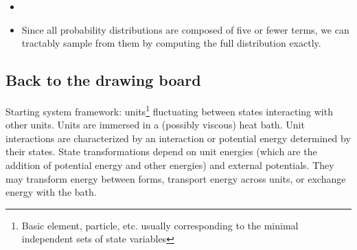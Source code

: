 \documentclass[12pt,letterpaper]{article}
\newcommand{\mb}{\mathbf}
\begin{document}
\begin{itemize}
\begin{align*}
\end{align*}
For $j \in  S$, write
\begin{align*}
w'_{j} = \left|q_{i}q_{j}(\mb{e}_{ij} \cdot \mb{n})\right| \quad \textrm{and} \quad w_{j} = {w'_{j} \over \sum_{j}w'_{j}},
\end{align*}
where $\mb{e}_{ij}$ is the unit vector form $i$ toward $j$. Then
\begin{align*}
M = \sum_{j \in S}w_{j}m_{j} \quad \textrm{and} \quad V = {1 \over M}\sum_{j \in S}w_{j}\mb{p}_{j},
\end{align*}
and each particle $j \in S$ attains momentum
\begin{align*}
\mb{p}'_{j} = \mb{p}_{j} + {w_{j}m_{j} \over M}J\mb{n}.
\end{align*}
Let $\Delta U_{\mb{e}}$ be the energy difference produced by moving particle $i$ from $\mb{r}_{i}$ to $\mb{r}_{i} + \mb{e}$ and
\begin{align*}
K_{\mb{e}} = {1 \over 2m_{i}}\max\{\mb{p}_{i} \cdot \mb{e}, 0\}^{2}
\end{align*}
be the kinetic energy of $i$ in the direction of $\mb{e}$. Then the rate $r^{C}_{i,\mb{e}}$ of the event is given by
\begin{align*}
r^{C}_{i,\mb{e}}(\mb{X}) &= \nu_{C}\mb{1}[K_{n} > 0 \textrm{ and } i \textrm{ is not bound} \textrm{ and } (r_{i} + \mb{e} \textrm{ is occupied or } K_{n} < \Delta U_{\mb{e}})] \\
&\qquad\times \sigma(\rho(\max\{u, 0\} - u_{0})),
\end{align*}
where $\sigma$ is the sigmoid function, $\rho$ is a steepness constant, $u_{0}$ is threshold velocity scale, and $\nu_{C}$ should be chosen to set the base rate to the same scale as other event rates.
\item
\item Since all probability distributions are composed of five or fewer terms, we can tractably sample from them by computing the full distribution exactly.
\end{itemize}


\subsection{Back to the drawing board}

Starting system framework: units\footnote{Basic element, particle, etc. usually corresponding to the minimal independent sets of state variables} fluctuating between states interacting with other units. Units are immersed in a (possibly viscous) heat bath. Unit interactions are characterized by an interaction or potential energy determined by their states. State transformations depend on unit energies (which are the addition of potential energy and other energies) and external potentials. They may transform energy between forms, transport energy across units, or exchange energy with the bath.
\end{document}

